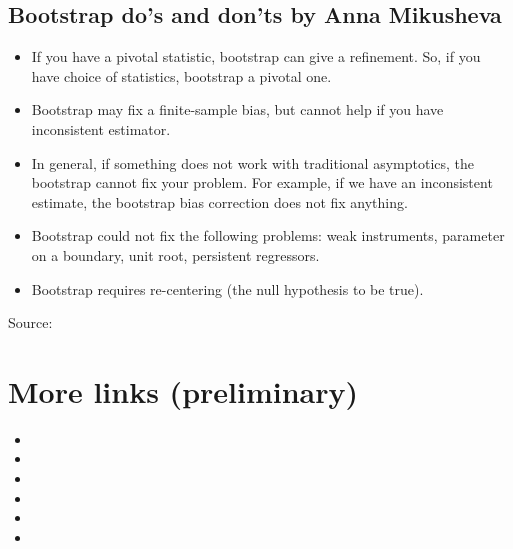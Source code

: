 \documentclass[letterpaper,10pt,english]{sphinxmanual}
\begin{document}
\subsection{Bootstrap do’s and don’ts by Anna Mikusheva}
\label{\detokenize{topics/bootstrap:bootstrap-dos-and-donts-by-anna-mikusheva}}\begin{itemize}
\item {} 
If you have a pivotal statistic,  bootstrap can give a refinement.  So, if you have choice
of statistics, bootstrap a pivotal one.

\item {} 
Bootstrap may fix a finite-sample bias, but cannot help if you have inconsistent estimator.

\item {} 
In  general,  if  something  does  not  work  with  traditional  asymptotics,  the
bootstrap  cannot  fix  your problem. For example, if we have an inconsistent estimate, the
bootstrap bias correction does not fix anything.

\item {} 
Bootstrap could not fix the following problems: weak instruments, parameter on a boundary,
unit root, persistent regressors.

\item {} 
Bootstrap requires re-centering (the null hypothesis to be true).

\end{itemize}

Source: 


\section{More links (preliminary)}
\label{\detokenize{topics/bootstrap:more-links-preliminary}}\begin{itemize}
\item {} 

\item {} 

\item {} 

\item {} 

\item {} 

\item {} 

\end{itemize}
\end{document}
